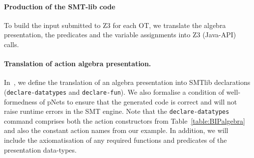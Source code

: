 \documentclass[smallcondensed]{svjour3}
\newcommand{\noteSB}[2][color=green!40, size=\tiny]{\todo[#1]{{\bf Simon: } {#2}}}
\begin{document}

\paragraph{Production of the SMT-lib code}
  To build the input submitted to Z3 for each OT,
we translate the algebra presentation, the predicates and the
variable assignments into Z3 (Java-API) calls.

\paragraph{Translation of action algebra presentation.}
In~\cite{AVOCS18}, we  define the translation of an algebra presentation into
SMTlib declarations (\texttt{declare-datatypes} and
\texttt{declare-fun}). We also formalise a condition of well-formedness of pNets to ensure that the generated code is correct
and will not raise runtime errors in the SMT engine. Note that the
\texttt{declare-datatypes} command comprises both the action
constructors from Table~\ref{table:BIPalgebra} and also the constant action
names from our example.
In addition, we will include the axiomatisation of any required functions
and predicates of the presentation data-types.


\end{document}
